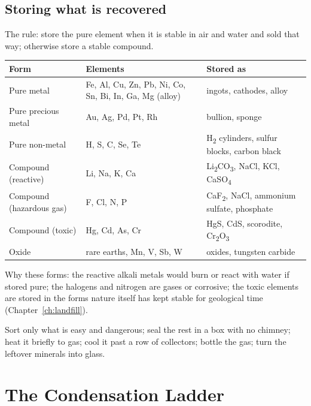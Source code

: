 \documentclass[11pt,a4paper]{article}
\begin{document}
\subsection{Storing what is recovered}
The rule: store the pure element when it is stable in air and water and sold that way; otherwise store a stable compound.
\begin{center}
\small
\begin{tabular}{@{}>{\raggedright\arraybackslash}p{3.3cm}>{\raggedright\arraybackslash}p{5.6cm}>{\raggedright\arraybackslash}p{5.4cm}@{}}
\toprule
\textbf{Form} & \textbf{Elements} & \textbf{Stored as} \\
\midrule
Pure metal & Fe, Al, Cu, Zn, Pb, Ni, Co, Sn, Bi, In, Ga, Mg (alloy) & ingots, cathodes, alloy \\
Pure precious metal & Au, Ag, Pd, Pt, Rh & bullion, sponge \\
Pure non-metal & H, S, C, Se, Te & H\textsubscript{2} cylinders, sulfur blocks, carbon black \\
Compound (reactive) & Li, Na, K, Ca & Li\textsubscript{2}CO\textsubscript{3}, NaCl, KCl, CaSO\textsubscript{4} \\
Compound (hazardous gas) & F, Cl, N, P & CaF\textsubscript{2}, NaCl, ammonium sulfate, phosphate \\
Compound (toxic) & Hg, Cd, As, Cr & HgS, CdS, scorodite, Cr\textsubscript{2}O\textsubscript{3} \\
Oxide & rare earths, Mn, V, Sb, W & oxides, tungsten carbide \\
\bottomrule
\end{tabular}
\end{center}
Why these forms: the reactive alkali metals would burn or react with water if stored pure; the halogens and nitrogen are gases or corrosive; the toxic elements are stored in the forms nature itself has kept stable for geological time (Chapter~\ref{ch:landfill}).

\begin{plain}
Sort only what is easy and dangerous; seal the rest in a box with no chimney; heat it briefly to gas; cool it past a row of collectors; bottle the gas; turn the leftover minerals into glass.
\end{plain}

\section{The Condensation Ladder}\label{ch:ladder}
\end{document}
